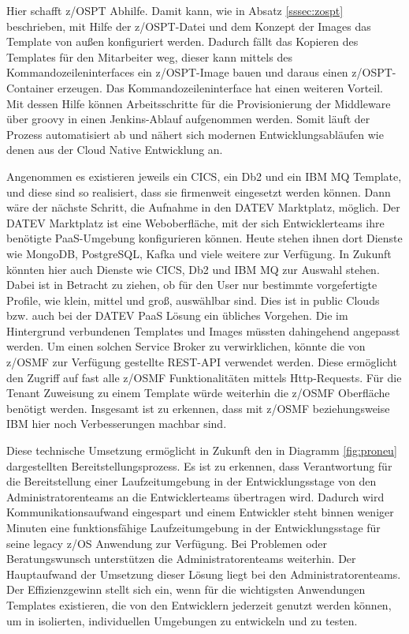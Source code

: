 Hier schafft z/OSPT Abhilfe.
Damit kann, wie in Absatz \ref{sssec:zospt} beschrieben, mit Hilfe der z/OSPT-Datei und dem Konzept der Images das Template von außen konfiguriert werden.
Dadurch fällt das Kopieren des Templates für den Mitarbeiter weg, dieser kann mittels des Kommandozeileninterfaces ein z/OSPT-Image bauen und daraus einen z/OSPT-Container erzeugen.
Das Kommandozeileninterface hat einen weiteren Vorteil.
Mit dessen Hilfe können Arbeitsschritte für die Provisionierung der Middleware über groovy in einen Jenkins-Ablauf aufgenommen werden.
Somit läuft der Prozess automatisiert ab und nähert sich modernen Entwicklungsabläufen wie denen aus der Cloud Native Entwicklung an.

Angenommen es existieren jeweils ein CICS, ein Db2 und ein IBM MQ Template, und diese sind so realisiert, dass sie firmenweit eingesetzt werden können.
Dann wäre der nächste Schritt, die Aufnahme in den \glqq DATEV Marktplatz\grqq, möglich.
Der \glqq DATEV Marktplatz\grqq{} ist eine Weboberfläche, mit der sich Entwicklerteams ihre benötigte PaaS-Umgebung konfigurieren können.
Heute stehen ihnen dort Dienste wie MongoDB, PostgreSQL, Kafka und viele weitere zur Verfügung.
In Zukunft könnten hier auch Dienste wie CICS, Db2 und IBM MQ zur Auswahl stehen.
Dabei ist in Betracht zu ziehen, ob für den User nur bestimmte vorgefertigte Profile, wie \glqq klein\grqq, \glqq mittel\grqq{} und \glqq groß\grqq, auswählbar sind. 
Dies ist in public Clouds bzw. auch bei der DATEV PaaS Lösung ein übliches Vorgehen.
Die im Hintergrund verbundenen Templates und Images müssten dahingehend angepasst werden.
Um einen solchen \glqq Service Broker\grqq{} zu verwirklichen, könnte die von z/OSMF zur Verfügung gestellte REST-API verwendet werden.
Diese ermöglicht den Zugriff auf fast alle z/OSMF Funktionalitäten mittels Http-Requests.
Für die Tenant Zuweisung zu einem Template würde weiterhin die z/OSMF Oberfläche benötigt werden.
Insgesamt ist zu erkennen, dass mit z/OSMF beziehungsweise IBM hier noch Verbesserungen machbar sind.

Diese technische Umsetzung ermöglicht in Zukunft den in Diagramm \ref{fig:proneu} dargestellten Bereitstellungsprozess.
Es ist zu erkennen, dass Verantwortung für die Bereitstellung einer Laufzeitumgebung in der Entwicklungsstage von den Administratorenteams an die Entwicklerteams übertragen wird.
Dadurch wird Kommunikationsaufwand eingespart und einem Entwickler steht binnen weniger Minuten eine funktionsfähige Laufzeitumgebung in der Entwicklungsstage für seine legacy z/OS Anwendung zur Verfügung.
Bei Problemen oder Beratungswunsch unterstützen die Administratorenteams weiterhin.
Der Hauptaufwand der Umsetzung dieser Lösung liegt bei den Administratorenteams.
Der Effizienzgewinn stellt sich ein, wenn für die wichtigsten Anwendungen Templates existieren, die von den Entwicklern jederzeit genutzt werden können, um in isolierten, individuellen Umgebungen zu entwickeln und zu testen.

